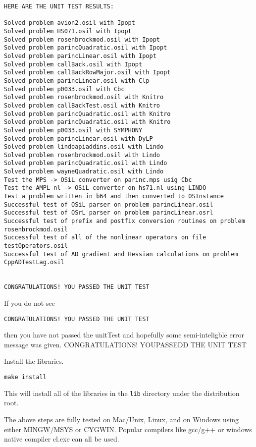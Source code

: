 \documentclass[12pt]{article}
\renewcommand{\_}{{\char"5F}}
\renewcommand{\{}{{\char"7B}}
\renewcommand{\}}{{\char"7D}}
\renewcommand{\^}{{\char"0D}}
\renewcommand{\'}{{\char"0D}}
\begin{document}
{\small
\begin{verbatim}
HERE ARE THE UNIT TEST RESULTS:

Solved problem avion2.osil with Ipopt
Solved problem HS071.osil with Ipopt
Solved problem rosenbrockmod.osil with Ipopt
Solved problem parincQuadratic.osil with Ipopt
Solved problem parincLinear.osil with Ipopt
Solved problem callBack.osil with Ipopt
Solved problem callBackRowMajor.osil with Ipopt
Solved problem parincLinear.osil with Clp
Solved problem p0033.osil with Cbc
Solved problem rosenbrockmod.osil with Knitro
Solved problem callBackTest.osil with Knitro
Solved problem parincQuadratic.osil with Knitro
Solved problem parincQuadratic.osil with Knitro
Solved problem p0033.osil with SYMPHONY
Solved problem parincLinear.osil with DyLP
Solved problem lindoapiaddins.osil with Lindo
Solved problem rosenbrockmod.osil with Lindo
Solved problem parincQuadratic.osil with Lindo
Solved problem wayneQuadratic.osil with Lindo
Test the MPS -> OSiL converter on parinc.mps usig Cbc
Test the AMPL nl -> OSiL converter on hs71.nl using LINDO
Test a problem written in b64 and then converted to OSInstance
Successful test of OSiL parser on problem parincLinear.osil
Successful test of OSrL parser on problem parincLinear.osrl
Successful test of prefix and postfix conversion routines on problem rosenbrockmod.osil
Successful test of all of the nonlinear operators on file testOperators.osil
Successful test of AD gradient and Hessian calculations on problem CppADTestLag.osil


CONGRATULATIONS! YOU PASSED THE UNIT TEST
\end{verbatim}
}

If you do not see
\begin{verbatim}
CONGRATULATIONS! YOU PASSED THE UNIT TEST
\end{verbatim}
then you have not passed the unitTest and hopefully some semi-inteligble error message was given. CONGRATULATIONS! YOUPASSEDD THE UNIT TEST


  Install the libraries.

\begin{verbatim}
make install
\end{verbatim}

This will install all of the libraries in the {\tt lib} directory under the distribution root. 


The above steps are fully tested on Mac/Unix, Linux, and on Windows using either MINGW/MSYS or CYGWIN. Popular compilers like gcc/g++ or windows native compiler cl.exe can all be used.
\end{document}
